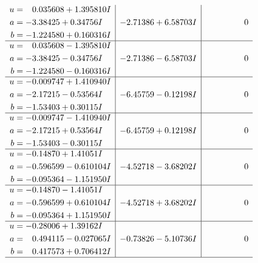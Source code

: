 \documentclass[1p]{elsarticle_modified}
\theoremstyle{definition}
\begin{document}
$$\begin{array}{c|c|c}
\begin{aligned}
u &= \phantom{-}0.035608 + 1.395810 I \\
a &= -3.38425 + 0.34756 I \\
b &= -1.224580 + 0.160316 I\end{aligned}
 & -2.71386 + 6.58703 I & \phantom{-0.000000 } 0 \\ \hline\begin{aligned}
u &= \phantom{-}0.035608 - 1.395810 I \\
a &= -3.38425 - 0.34756 I \\
b &= -1.224580 - 0.160316 I\end{aligned}
 & -2.71386 - 6.58703 I & \phantom{-0.000000 } 0 \\ \hline\begin{aligned}
u &= -0.009747 + 1.410940 I \\
a &= -2.17215 - 0.53564 I \\
b &= -1.53403 + 0.30115 I\end{aligned}
 & -6.45759 - 0.12198 I & \phantom{-0.000000 } 0 \\ \hline\begin{aligned}
u &= -0.009747 - 1.410940 I \\
a &= -2.17215 + 0.53564 I \\
b &= -1.53403 - 0.30115 I\end{aligned}
 & -6.45759 + 0.12198 I & \phantom{-0.000000 } 0 \\ \hline\begin{aligned}
u &= -0.14870 + 1.41051 I \\
a &= -0.596599 - 0.610104 I \\
b &= -0.095364 - 1.151950 I\end{aligned}
 & -4.52718 - 3.68202 I & \phantom{-0.000000 } 0 \\ \hline\begin{aligned}
u &= -0.14870 - 1.41051 I \\
a &= -0.596599 + 0.610104 I \\
b &= -0.095364 + 1.151950 I\end{aligned}
 & -4.52718 + 3.68202 I & \phantom{-0.000000 } 0 \\ \hline\begin{aligned}
u &= -0.28006 + 1.39162 I \\
a &= \phantom{-}0.494115 - 0.027065 I \\
b &= \phantom{-}0.417573 + 0.706412 I\end{aligned}
 & -0.73826 - 5.10736 I & \phantom{-0.000000 } 0\\
 \hline 

\end{array}$$
\end{document}
